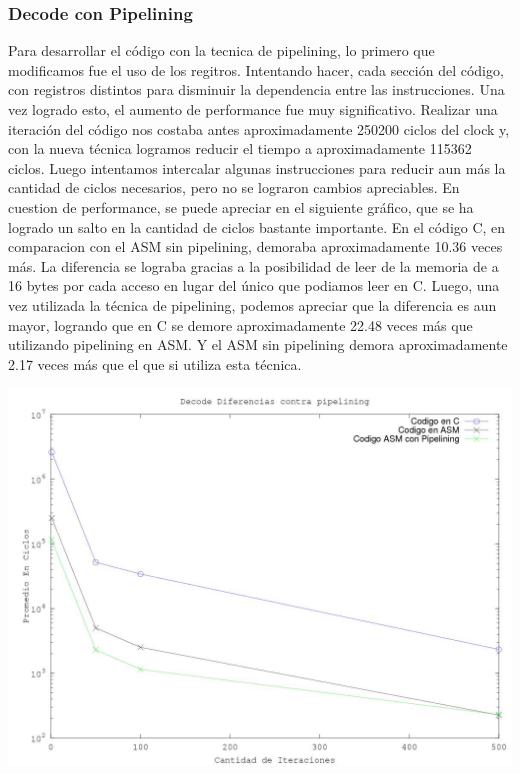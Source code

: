 \subsubsection{Decode con Pipelining}
Para desarrollar el c\'odigo con la tecnica de pipelining, lo primero que modificamos fue el uso de los regitros. Intentando hacer, cada secci\'on del c\'odigo, con registros distintos para disminuir la dependencia entre las instrucciones. Una vez logrado esto, el aumento de performance fue muy significativo. Realizar una iteraci\'on del c\'odigo nos costaba antes aproximadamente 250200 ciclos del clock y, con la nueva t\'ecnica logramos reducir el tiempo a aproximadamente 115362 ciclos.
\newline
Luego intentamos intercalar algunas instrucciones para reducir aun m\'as la cantidad de ciclos necesarios, pero no se lograron cambios apreciables.
\newline
\newline
En cuestion de performance, se puede apreciar en el siguiente gr\'afico, que se ha logrado un salto en la cantidad de ciclos bastante importante. En el c\'odigo C, en comparacion con el ASM sin pipelining, demoraba aproximadamente 10.36 veces m\'as. La diferencia se lograba gracias a la posibilidad de leer de la memoria de a 16 bytes por cada acceso en lugar del \'unico que podiamos leer en C. Luego, una vez utilizada la t\'ecnica de pipelining, podemos apreciar que la diferencia es aun mayor, logrando que en C se demore aproximadamente 22.48 veces m\'as que utilizando pipelining en ASM. Y el ASM sin pipelining demora aproximadamente 2.17 veces m\'as que el que si utiliza esta t\'ecnica.
\newline

\includegraphics[scale=0.7]{imagenes/DecodePipelining.jpg}
